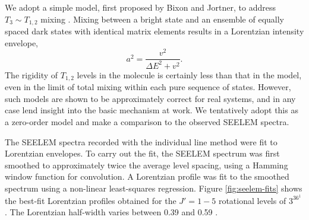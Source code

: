 \documentclass[12pt]{mitthesis}
\begin{document}
We adopt a simple model, first proposed by Bixon and Jortner, to
address $T_3 \sim T_{1,2}$ mixing \cite{bixon68}.  Mixing between a
bright state and an ensemble of equally spaced dark states with
identical matrix elements results in a Lorentzian intensity envelope,
\begin{equation}
  a^2 = \frac{v^2}{\Delta E^2 + v^2}.
\end{equation}
The rigidity of $T_{1,2}$ levels in the molecule is certainly less
than that in the model, even in the limit of total mixing within each
pure sequence of states.  However, such models are shown to be
approximately correct for real systems, and in any case lend insight
into the basic mechanism at work.  We tentatively adopt this as a
zero-order model and make a comparison to the observed SEELEM spectra.

The SEELEM spectra recorded with the individual line method were fit to
Lorentzian envelopes.  To carry out the fit, the SEELEM spectrum was
first smoothed to approximately twice the average level spacing, using
a Hamming window function for convolution.  A Lorentzian profile was
fit to the smoothed spectrum using a non-linear least-squares
regression.  Figure \ref{fig:seelem-fits} shows the best-fit
Lorentzian profiles obtained for the $J'=1-5$ rotational levels of
$3^36^1$ .  The Lorentzian half-width varies between 0.39 and
0.59 \rcm.


\end{document}
